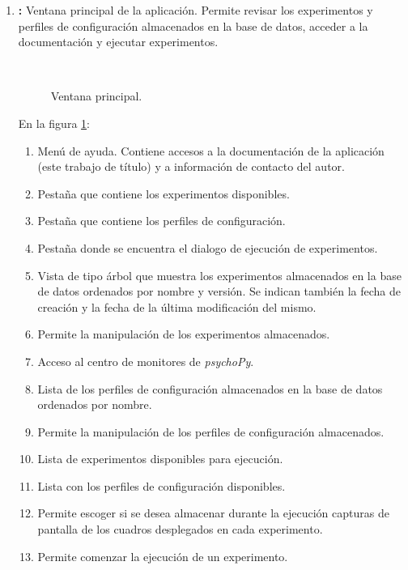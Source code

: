 \documentclass[\main/Main.tex]{subfiles}
\begin{document}
			\newpage 
			\begin{enumerate}\setlength\itemsep{-0.5em}
				\item \textbf{:} Ventana principal de la aplicación. Permite revisar los experimentos y perfiles de configuración almacenados en la base de datos, acceder a la documentación y ejecutar experimentos.
				\begin{figure}[H]
					\centering
					\\
					\caption{Ventana principal.}
					\label{fig:03_gui_main}
				\end{figure} 

				\vspace{-5mm}

				En la figura \ref{fig:03_gui_main}:
				\begin{enumerate}[(1)]\setlength\itemsep{-0.5em}
					\item Menú de ayuda. Contiene accesos a la documentación de la aplicación (este trabajo de título) y a información de contacto del autor.
					\item Pestaña que contiene los experimentos disponibles. 
					\item Pestaña que contiene los perfiles de configuración. 
					\item Pestaña donde se encuentra el dialogo de ejecución de experimentos. 
					\item Vista de tipo árbol que muestra los experimentos almacenados en la base de datos ordenados por nombre y versión. Se indican también la fecha de creación y la fecha de la última modificación del mismo.  
					\item Permite la manipulación de los experimentos almacenados. 
					\item Acceso al centro de monitores de \textit{psychoPy}.
					\item Lista de los perfiles de configuración almacenados en la base de datos ordenados por nombre.
					\item Permite la manipulación de los perfiles de configuración almacenados.
					\item Lista de experimentos disponibles para ejecución. 
					\item Lista con los perfiles de configuración disponibles. 
					\item Permite escoger si se desea almacenar durante la ejecución capturas de pantalla de los cuadros desplegados en cada experimento.
					\item Permite comenzar la ejecución de un experimento. 
				\end{enumerate}


\end{enumerate}
\end{document}
